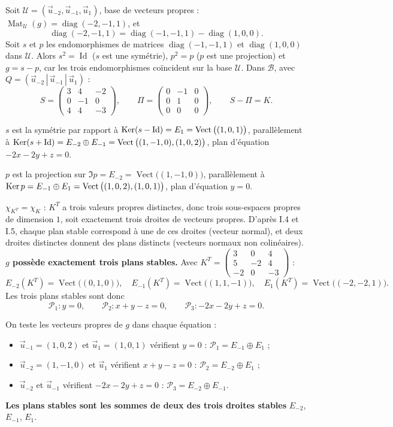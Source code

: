 \documentclass[a4paper,11pt]{article}
\numberwithin{equation}{section}
\numberwithin{figure}{section}
\numberwithin{table}{section}
\theoremstyle{enonce}
\theoremstyle{exemple}
\theoremstyle{remarque}
\newcommand{\vect}{\operatorname{Vect}}
\newcommand{\Mat}{\operatorname{Mat}}
\newcommand{\Id}{\operatorname{Id}}
\newcommand{\Q}[1]{\par\needspace{3\baselineskip}\medskip\noindent{\sffamily\bfseries\color{Bleu}#1}\enspace}
\begin{document}
\Q{III.2(a)} Soit $\mathcal U=(\vec u_{-2},\vec u_{-1},\vec u_1)$, base de vecteurs propres : $\Mat_{\mathcal U}(g)=\operatorname{diag}(-2,-1,1)$, et
\[\operatorname{diag}(-2,-1,1)=\operatorname{diag}(-1,-1,1)-\operatorname{diag}(1,0,0).\]
Soit $s$ et $p$ les endomorphismes de matrices $\operatorname{diag}(-1,-1,1)$ et $\operatorname{diag}(1,0,0)$ dans $\mathcal U$. Alors
$s^2=\Id$ ($s$ est une symétrie), $p^2=p$ ($p$ est une projection) et $g=s-p$, car les trois endomorphismes coïncident sur la base
$\mathcal U$. Dans $\mathcal B$, avec $Q=(\vec u_{-2}\,|\,\vec u_{-1}\,|\,\vec u_1)$ :
\[S=\begin{pmatrix}3&4&-2\\0&-1&0\\4&4&-3\end{pmatrix},\qquad \Pi=\begin{pmatrix}0&-1&0\\0&1&0\\0&0&0\end{pmatrix},\qquad
S-\Pi=K .\]

\Q{III.2(b)} \emph{$s$} est la symétrie par rapport à $\Ker(s-\Id)=E_1=\vect\big((1,0,1)\big)$, parallèlement à
$\Ker(s+\Id)=E_{-2}\oplus E_{-1}=\vect\big((1,-1,0),(1,0,2)\big)$, plan d'équation $-2x-2y+z=0$.

\emph{$p$} est la projection sur $\Im p=E_{-2}=\vect\big((1,-1,0)\big)$, parallèlement à $\Ker p=E_{-1}\oplus E_1=\vect\big((1,0,2),(1,0,1)\big)$,
plan d'équation $y=0$.

\Q{III.3(a)} $\chi_{K^T}=\chi_K$ : $K^T$ a trois valeurs propres distinctes, donc trois sous-espaces propres de dimension $1$, soit
exactement trois droites de vecteurs propres. D'après I.4 et I.5, chaque plan stable correspond à une de ces droites (vecteur
normal), et deux droites distinctes donnent des plans distincts (vecteurs normaux non colinéaires). \textbf{$g$ possède exactement
trois plans stables.} Avec $K^T=\begin{pmatrix}3&0&4\\5&-2&4\\-2&0&-3\end{pmatrix}$ :
\[E_{-2}(K^T)=\vect\big((0,1,0)\big),\quad E_{-1}(K^T)=\vect\big((1,1,-1)\big),\quad E_1(K^T)=\vect\big((-2,-2,1)\big).\]
Les trois plans stables sont donc
\[\mathcal P_1 : y=0,\qquad \mathcal P_2 : x+y-z=0,\qquad \mathcal P_3 : -2x-2y+z=0 .\]

\Q{III.3(b)} On teste les vecteurs propres de $g$ dans chaque équation :
\begin{itemize}[leftmargin=1.2em,itemsep=2pt,topsep=2pt]
\item $\vec u_{-1}=(1,0,2)$ et $\vec u_1=(1,0,1)$ vérifient $y=0$ : $\mathcal P_1=E_{-1}\oplus E_1$ ;
\item $\vec u_{-2}=(1,-1,0)$ et $\vec u_1$ vérifient $x+y-z=0$ : $\mathcal P_2=E_{-2}\oplus E_1$ ;
\item $\vec u_{-2}$ et $\vec u_{-1}$ vérifient $-2x-2y+z=0$ : $\mathcal P_3=E_{-2}\oplus E_{-1}$.
\end{itemize}
\textbf{Les plans stables sont les sommes de deux des trois droites stables} $E_{-2}$, $E_{-1}$, $E_1$.
\end{document}
